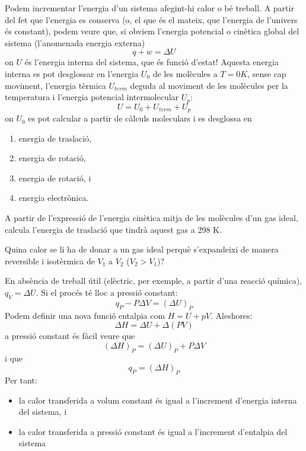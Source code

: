 Podem incrementar l'energia d'un sistema afegint-hi calor o bé treball. A partir del fet que l'energia es conserva (o, el que és el mateix, que l'energia de l'univers és constant), podem veure que, si obviem l'energia potencial o cinètica global del sistema (l'anomenada energia externa) 
\[
q+w=\Delta U
\]
on $U$ és l'energia interna del sistema, que és funció d'estat!
Aquesta energia interna es pot desglossar en l'energia $U_0$ de les molècules a $T=0K$, sense cap moviment, l'energia tèrmica $U_{term}$ deguda al moviment de les molècules per la temperatura i l'energia potencial intermolecular $U_p$:
\[
U=U_0+U_{term}+U_p
\]
on $U_0$ es pot calcular a partir de càlculs moleculars i es desglossa en 
\begin{enumerate}
\item energia de traslació,
\item energia de rotació,
\item energia de rotació, i 
\item energia electrònica.
\end{enumerate}
\begin{exr}
A partir de l'expressió de l'energia cinètica mitja de les molècules d'un gas ideal, calcula l'energia de traslació que tindrà aquest gas a 298 K.
\end{exr}
\begin{exr}
Quina calor se li ha de donar a un gas ideal perquè s'expandeixi de manera reversible i isotèrmica de $V_1$ a $V_2$ ($V_2>V_1$)?
\end{exr}
En absència de treball útil (elèctric, per exemple, a partir d'una reacció química), $q_V=\Delta U$.
Si el procés té lloc a pressió constant:
\[
q_P  -P\Delta V = (\Delta U)_P
\]
Podem definir una nova funció entalpia com $H=U+pV$.
Aleshores:
\[
\Delta H = \Delta U + \Delta(PV)
\]
a pressió constant és fàcil veure que
\[
(\Delta H)_P = (\Delta U)_P + P\Delta V
\]
i que 
\[
q_P=(\Delta H)_P 
\]
Per tant:
\begin{itemize}
\item la calor transferida a volum constant és igual a l'increment d'energia interna del sistema, i
\item la calor transferida a pressió constant és igual a l'increment d'entalpia  del sistema
\end{itemize}

